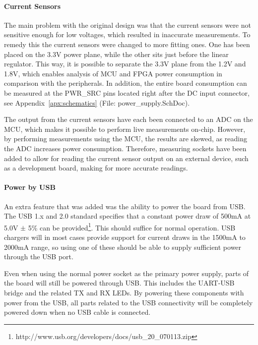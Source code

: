 \paragraph{Current Sensors} \label{psu:current_sensors}

The main problem with the original design was that the current sensors were not
sensitive enough for low voltages, which resulted in inaccurate measurements. To
remedy this the current sensors were changed to more fitting ones. One has been
placed on the 3.3V power plane, while the other sits just before the linear
regulator. This way, it is possible to separate the 3.3V plane from the 1.2V and
1.8V, which enables analysis of MCU and FPGA power consumption in comparison
with the peripherals. In addition, the entire board consumption can be measured
at the PWR\_SRC pins located right after the DC input connector, see
Appendix~\ref{apx:schematics}  (File: power\_supply.SchDoc).

The output from the current sensors have each been connected to an ADC on the
MCU, which makes it possible to perform live measurements on-chip. However, by
performing measurements using the MCU, the results are skewed, as reading the
ADC increases power consumption. Therefore, measuring sockets have been added to
allow for reading the current sensor output on an external device, such as a
development board, making for more accurate readings.

\paragraph{Power by USB} \label{psu:usb}

An extra feature that was added was the ability to power the board from USB. The
USB 1.x and 2.0 standard specifies that a constant power draw of 500mA at 5.0V
$\pm$ 5\% can be provided\footnote{
http://www.usb.org/developers/docs/usb\_20\_070113.zip}. This should suffice for
normal operation. USB chargers will in most cases provide support for current
draws in the 1500mA to 2000mA range, so using one of these should
be able to supply sufficient power through the USB port.

Even when using the normal power socket as the primary power supply, parts of
the board will still be powered through USB. This includes the UART-USB bridge
and the related TX and RX LEDs. By powering these components with power from the
USB, all parts related to the USB connectivity will be completely powered down
when no USB cable is connected.
